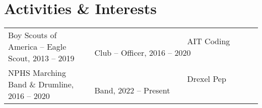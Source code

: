 \documentclass[letterpaper,11pt]{article}
\begin{document}
\section{\textcolor{HeaderColor}{\textbf{\large Activities \& Interests}}}
\begin{itemize}[leftmargin=0in, label={}]
	{\item{
		\begin{tabular}{l l l}
		        {Boy Scouts of America -- Eagle Scout, 2013 -- 2019} & {~~~~~~~~~~~~~~~~~~~~~~~AIT Coding Club -- Officer, 2016 -- 2020} \\
			    {NPHS Marching Band \& Drumline, 2016 -- 2020} & {~~~~~~~~~~~~~~~~~~~~~~~Drexel Pep Band, 2022 -- Present}
		\end{tabular}
	}}
\end{itemize}

\end{document}
